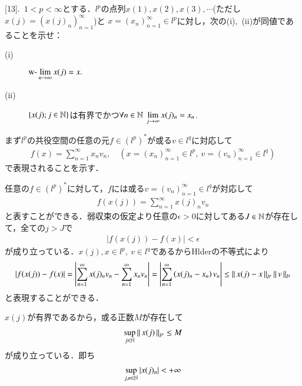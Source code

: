 [13].\ $1 < p < \infty$とする．$l^p$の点列$x(1),x(2),x(3),\cdots$(ただし$x(j)=\left(x(j)_n\right)_{n=1}^{\infty}$)と
$x=(x_n)_{n=1}^{\infty} \in l^p$に対し，次の(i),\ (ii)が同値であることを示せ：
\begin{description}
	\item[\rm{(i)}] $\displaystyle \mbox{w-}\lim_{n \to \infty} x(j) = x.$
	\item[\rm{(ii)}] $\left\{x(j);j\in\mathbb{N}\right\}$は有界でかつ$\forall n \in \mathbb{N}\ \displaystyle \lim_{j \to \infty}x(j)_n = x_n$.
\end{description}

\begin{prf}
\begin{description}\mbox{}
	\item[$l^p$の共役空間] まず$l^p$の共役空間の任意の元$f \in \left(l^p\right)^*$が或る$v \in l^q$に対応して
		\begin{align}
			f(x) = \sum_{n=1}^{\infty} x_n v_n, \quad \left(x = (x_n)_{n=1}^{\infty} \in l^p,\ v = (v_n)_{n=1}^{\infty} \in l^q\right)
		\end{align}
		で表現されることを示す．
	\item[\rm{(i)} $\Rightarrow$ \rm{(ii)}] 
		任意の$f \in \left(l^p\right)^*$に対して，$f$には或る$v = (v_n)_{n=1}^{\infty} \in l^q$が対応して
		\begin{align}
			f(x(j)) = \sum_{n=1}^{\infty} x(j)_n v_n
		\end{align}
		と表すことができる．弱収束の仮定より任意の$\epsilon > 0$に対してある$J \in \mathbb{N}$が存在して，全ての$j > J$で
		\begin{align}
			|f(x(j)) - f(x)| < \epsilon
		\end{align}
		が成り立っている．$x(j),x \in l^p,\ v \in l^q$であるからHlderの不等式により
		\begin{align}
			|f(x(j)) - f(x)| = \left|\sum_{n=1}^{\infty} x(j)_n v_n - \sum_{n=1}^{\infty} x_n v_n  \right|
			= \left|\sum_{n=1}^{\infty} \left(x(j)_n - x_n\right) v_n \right|
			\leq \left\|\, x(j) - x\, \right\|_{l^p}\left\|\, v\, \right\|_{l^q}
		\end{align}
		と表現することができる．
	\item[\rm{(ii)} $\Rightarrow$ \rm{(i)}] $x(j)$が有界であるから，或る正数$M$が存在して
		\begin{align}
			\operatorname*{sup}_{j \in \mathbb{N}} \left\|\, x(j)\, \right\|_{l^p} \leq M
		\end{align}
		が成り立っている．即ち
		\begin{align}
			\operatorname*{sup}_{j,n \in \mathbb{N}} \left|x(j)_n\right| < +\infty
		\end{align}

\end{description}
\end{prf}
